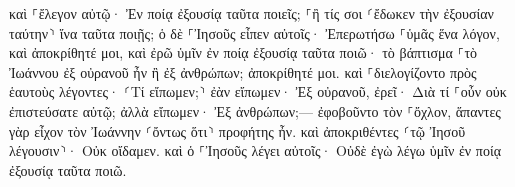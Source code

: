 \documentclass{openreader}
\begin{document}
καὶ ⸀ἔλεγον αὐτῷ· Ἐν ποίᾳ ἐξουσίᾳ ταῦτα ποιεῖς; ⸀ἢ τίς σοι ⸂ἔδωκεν τὴν ἐξουσίαν ταύτην⸃ ἵνα ταῦτα ποιῇς; 
ὁ δὲ ⸀Ἰησοῦς εἶπεν αὐτοῖς· Ἐπερωτήσω ⸀ὑμᾶς ἕνα λόγον, καὶ ἀποκρίθητέ μοι, καὶ ἐρῶ ὑμῖν ἐν ποίᾳ ἐξουσίᾳ ταῦτα ποιῶ· 
τὸ βάπτισμα ⸀τὸ Ἰωάννου ἐξ οὐρανοῦ ἦν ἢ ἐξ ἀνθρώπων; ἀποκρίθητέ μοι. 
καὶ ⸀διελογίζοντο πρὸς ἑαυτοὺς λέγοντες· ⸂Τί εἴπωμεν;⸃ ἐὰν εἴπωμεν· Ἐξ οὐρανοῦ, ἐρεῖ· Διὰ τί ⸀οὖν οὐκ ἐπιστεύσατε αὐτῷ; 
ἀλλὰ εἴπωμεν· Ἐξ ἀνθρώπων;— ἐφοβοῦντο τὸν ⸀ὄχλον, ἅπαντες γὰρ εἶχον τὸν Ἰωάννην ⸂ὄντως ὅτι⸃ προφήτης ἦν. 
καὶ ἀποκριθέντες ⸂τῷ Ἰησοῦ λέγουσιν⸃· Οὐκ οἴδαμεν. καὶ ὁ ⸀Ἰησοῦς λέγει αὐτοῖς· Οὐδὲ ἐγὼ λέγω ὑμῖν ἐν ποίᾳ ἐξουσίᾳ ταῦτα ποιῶ. 
\end{document}
